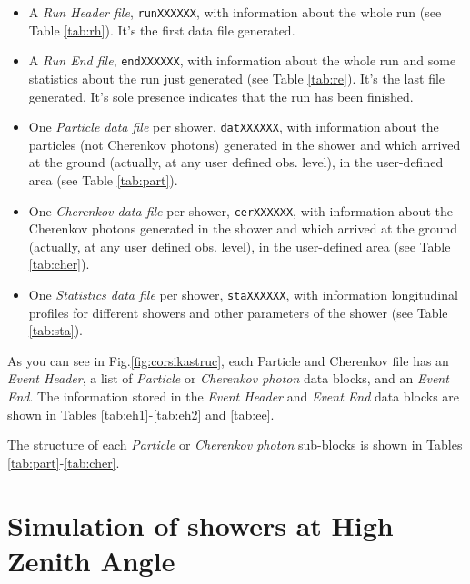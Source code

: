 \begin{itemize}
  
\item A \emph{Run Header file}, \texttt{runXXXXXX}, with information
  about the whole run (see Table \ref{tab:rh}). It's the first data
  file generated.
  
\item A \emph{Run End file}, \texttt{endXXXXXX}, with information
  about the whole run and some statistics about the run just generated
  (see Table \ref{tab:re}). It's the last file generated. It's sole
  presence indicates that the run has been finished.
  
\item One \emph{Particle data file} per shower, \texttt{datXXXXXX},
  with information about the particles (not Cherenkov photons)
  generated in the shower and which arrived at the ground (actually,
  at any user defined obs. level), in the user-defined area (see Table
  \ref{tab:part}).
  
\item One \emph{Cherenkov data file} per shower, \texttt{cerXXXXXX},
  with information about the Cherenkov photons generated in the shower
  and which arrived at the ground (actually, at any user defined obs.
  level), in the user-defined area (see Table \ref{tab:cher}).
  
\item One \emph{Statistics data file} per shower, \texttt{staXXXXXX},
  with information longitudinal profiles for different showers and
  other parameters of the shower (see Table \ref{tab:sta}).

\end{itemize}

As you can see in Fig.\ref{fig:corsikastruc}, each Particle and
Cherenkov file has an \emph{Event Header}, a list of \emph{Particle}
or \emph{Cherenkov photon} data blocks, and an \emph{Event End}. The
information stored in the \emph{Event Header} and \emph{Event End}
data blocks are shown in Tables \ref{tab:eh1}-\ref{tab:eh2} and
\ref{tab:ee}.

The structure of each \emph{Particle} or \emph{Cherenkov photon}
sub-blocks is shown in Tables \ref{tab:part}-\ref{tab:cher}.


\MORE%

\section{Simulation of showers at High Zenith Angle}


